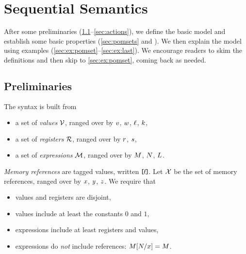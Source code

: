 \section{Sequential Semantics}
\label{sec:model}

After some preliminaries (\textsection\ref{sec:prelim}--\ref{sec:actions}),
we define the basic model and establish some basic properties
(\textsection\ref{sec:pomsets} and ).  We then explain the
model using examples (\textsection\ref{sec:ex:pomset}--\ref{sec:ex:last}).
We encourage readers to skim the definitions and then skip to
\textsection\ref{sec:ex:pomset}, coming back as needed.




\subsection{Preliminaries}
\label{sec:prelim}
The syntax is built from
\begin{itemize}
\item a set of \emph{values} $\mathcal{V}$, ranged over by
  $v$, $w$, $\ell$, $k$,
\item a set of \emph{registers} $\mathcal{R}$, ranged over by
  $r$, $s$,
\item a set of \emph{expressions} $\mathcal{M}$, ranged over by
  $M$, $N$,  $L$.
\end{itemize}

\emph{Memory references} are tagged values, written $\mkern-2mu\texttt{[}\mkern-2mu\ell \mkern-2mu\texttt{]}\mkern-2mu$.  Let $\mathcal{X}$
be the set of memory references, ranged over by $x$, $y$, $z$.
% 
We require that
\begin{itemize}
\item values and registers are disjoint, 
\item values include at least the constants $0$ and $1$,  
\item expressions include at least registers and values, 
\item expressions do \emph{not} include references: $M[N/x]=M$.
\end{itemize}

